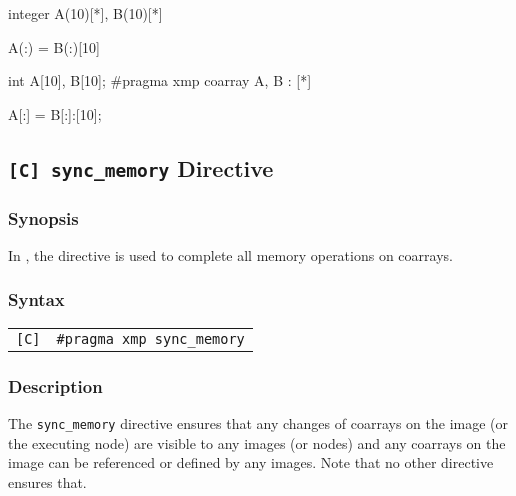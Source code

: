 \begin{minipage}{0.45\hsize}
\begin{center}
\begin{Fexample}
      integer A(10)[*], B(10)[*]


      A(:) = B(:)[10]
\end{Fexample}
\end{center}
\end{minipage}
%
\begin{minipage}{0.45\hsize}
\begin{center}
\begin{XCexampleR}
int A[10], B[10];
#pragma xmp coarray A, B : [*]

A[:] = B[:]:[10];
\end{XCexampleR}
\end{center}
\end{minipage}


\subsection{{\tt [C] sync\_memory} Directive}

\subsubsection*{Synopsis}

In {\XMPC}, the  directive is used to complete
all memory operations on coarrays.

\subsubsection*{Syntax}

\begin{tabular}{ll}
\verb![C]! & \verb|#pragma xmp sync_memory| \\
\end{tabular}

\subsubsection*{Description}


The {\tt sync\_memory} directive ensures that any changes of coarrays
on the image (or the executing node) are visible to any images (or
nodes) and any coarrays on the image can be referenced or defined by
any images.
%
Note that no other {\XMP} directive ensures that.

